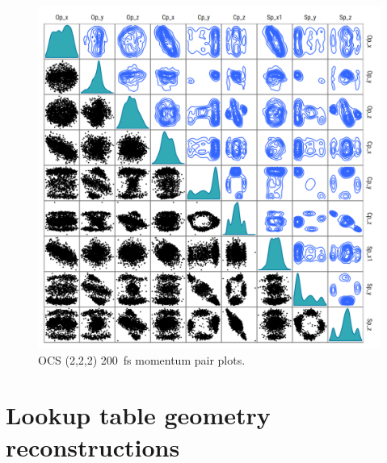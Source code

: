 \begin{figure}
  \centering
  \includegraphics[width=\textwidth]{Plots/OCS222200fsMomentumPairPlots.png}
  \caption[OCS (2,2,2) \SI{200}{\fs} momentum pair plots.]
  {OCS (2,2,2) \SI{200}{\fs} momentum pair plots.}
  \label{fig:OCS222200fsMomentumPairPlots}
\end{figure}

\section{Lookup table geometry reconstructions}

